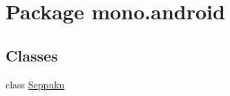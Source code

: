 \hypertarget{namespacemono_1_1android}{\section{Package mono.\+android}
\label{namespacemono_1_1android}
}
\subsection*{Classes}
\begin{DoxyCompactItemize}
\item 
class \hyperlink{classmono_1_1android_1_1_seppuku}{Seppuku}
\end{DoxyCompactItemize}
